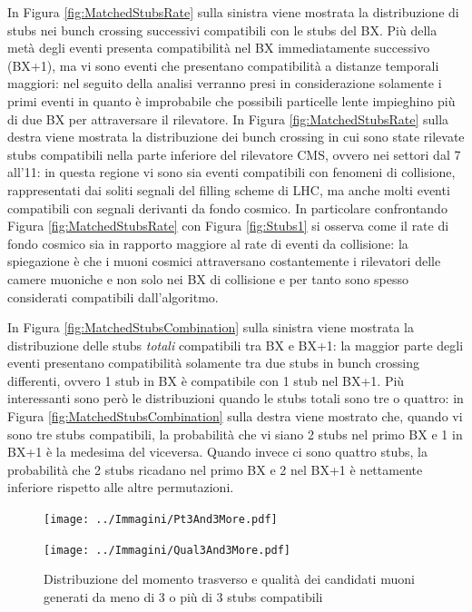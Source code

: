 In Figura \ref{fig:MatchedStubsRate} sulla sinistra viene mostrata la distribuzione di stubs nei bunch crossing successivi compatibili con le stubs del BX. Più della metà degli eventi presenta compatibilità nel BX immediatamente successivo (BX+1), ma vi sono eventi che presentano compatibilità a distanze temporali maggiori: nel seguito della analisi verranno presi in considerazione solamente i primi eventi in quanto è improbabile che possibili particelle lente impieghino più di due BX per attraversare il rilevatore. \newline
In Figura \ref{fig:MatchedStubsRate} sulla destra viene mostrata la distribuzione dei bunch crossing in cui sono state rilevate stubs compatibili nella parte inferiore del rilevatore CMS, ovvero nei settori dal 7 all'11: in questa regione vi sono sia eventi compatibili con fenomeni di collisione, rappresentati dai soliti segnali del filling scheme di LHC, ma anche molti eventi compatibili con segnali derivanti da fondo cosmico. In particolare confrontando Figura \ref{fig:MatchedStubsRate} con Figura \ref{fig:Stubs1} si osserva come il rate di fondo cosmico sia in rapporto maggiore al rate di eventi da collisione: la spiegazione è che i muoni cosmici attraversano costantemente i rilevatori delle camere muoniche e non solo nei BX di collisione e per tanto sono spesso considerati compatibili dall'algoritmo.

In Figura \ref{fig:MatchedStubsCombination} sulla sinistra viene mostrata la distribuzione delle stubs \textit{totali} compatibili tra BX e BX+1: la maggior parte degli eventi presentano compatibilità solamente tra due stubs in bunch crossing differenti, ovvero 1 stub in BX è compatibile con 1 stub nel BX+1. Più interessanti sono però le distribuzioni quando le stubs totali sono tre o quattro: in Figura \ref{fig:MatchedStubsCombination} sulla destra viene mostrato che, quando vi sono tre stubs compatibili, la probabilità che vi siano 2 stubs nel primo BX e 1 in BX+1 è la medesima del viceversa. Quando invece ci sono quattro stubs, la probabilità che 2 stubs ricadano nel primo BX e 2 nel BX+1 è nettamente inferiore rispetto alle altre permutazioni. 



\begin{figure}[t]
  \centering
  \begin{minipage}[b]{0.48\textwidth}
    \centering
    \texttt{[image: ../Immagini/Pt3And3More.pdf]} 
    \end{minipage}
    \hfill 
    \begin{minipage}[b]{0.48\textwidth}
      \centering
      \texttt{[image: ../Immagini/Qual3And3More.pdf]} 
    \end{minipage}
    \caption{Distribuzione del momento trasverso e qualità dei candidati muoni generati da meno di 3 o più di 3 stubs compatibili}
  \label{fig:PtQual3And3More}
\end{figure}



